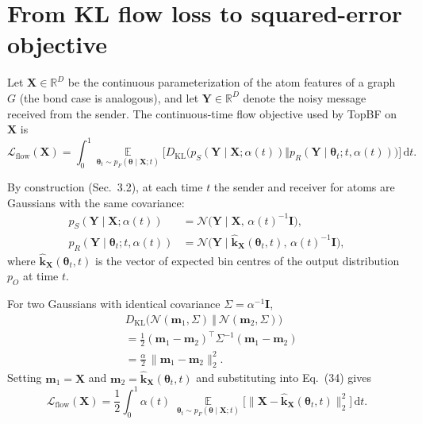 \documentclass[numsec,webpdf,contemporary,large]{oup-authoring-template}%
\theoremstyle{thmstyleone}%
\theoremstyle{thmstyletwo}%
\theoremstyle{thmstylethree}%
\begin{document}
\section{From KL flow loss to squared-error objective}
\label{app:loss}

Let $\mathbf{X}\in\mathbb{R}^{D}$ be the continuous parameterization of the atom features of a graph $G$
(the bond case is analogous), and let $\mathbf{Y}\in\mathbb{R}^{D}$ denote the noisy message received
from the sender. The continuous-time flow objective used by TopBF on $\mathbf{X}$ is
\begin{equation}
\mathcal{L}_{\text{flow}}(\mathbf{X})
=
\int_0^1 
\mathop{\mathbb{E}}\limits_{\boldsymbol{\theta}_t \sim p_F(\boldsymbol{\theta}\mid \mathbf{X};t)} \Big[ D_{\mathrm{KL}}\big( p_S(\mathbf{Y} \mid \mathbf{X};\alpha(t))
\Vert
p_R(\mathbf{Y} \mid \boldsymbol{\theta}_t; t,\alpha(t)) \big) \Big] \,\mathrm{d}t.
\label{eq:cts-flow-kl}
\end{equation}

By construction (Sec.~3.2), at each time $t$ the sender and receiver for atoms are Gaussians with the
same covariance:
\begin{align}
p_S(\mathbf{Y} \mid \mathbf{X};\alpha(t))
&=
\mathcal{N}\big(\mathbf{Y} \mid \mathbf{X},\,\alpha(t)^{-1}\mathbf{I}\big), \\
p_R(\mathbf{Y} \mid \boldsymbol{\theta}_t; t,\alpha(t))
&=
\mathcal{N}\big(\mathbf{Y} \mid \hat{\mathbf{k}}_{\mathbf{X}}(\boldsymbol{\theta}_t,t),\,\alpha(t)^{-1}\mathbf{I}\big),
\end{align}
where $\hat{\mathbf{k}}_{\mathbf{X}}(\boldsymbol{\theta}_t,t)$ is the vector of expected bin centres of
the output distribution $p_O$ at time $t$.

For two Gaussians with identical covariance $\Sigma = \alpha^{-1}\mathbf{I}$,
\begin{equation}
\begin{aligned}
& D_{\mathrm{KL}}\big(
\mathcal{N}(\mathbf{m}_1,\Sigma)\ \Vert\ \mathcal{N}(\mathbf{m}_2,\Sigma)
\big)\\
& =
\frac{1}{2}(\mathbf{m}_1-\mathbf{m}_2)^\top \Sigma^{-1} (\mathbf{m}_1-\mathbf{m}_2) \\
& =
\frac{\alpha}{2}\,\|\mathbf{m}_1-\mathbf{m}_2\|_2^2.
\end{aligned}
\end{equation}
Setting $\mathbf{m}_1=\mathbf{X}$ and $\mathbf{m}_2=\hat{\mathbf{k}}_{\mathbf{X}}(\boldsymbol{\theta}_t,t)$
and substituting into Eq.~(34) gives
\begin{equation}
\mathcal{L}_{\text{flow}}(\mathbf{X})
=
\frac{1}{2}
\int_0^1
\alpha(t)\;
\mathop{\mathbb{E}}\limits_{\boldsymbol{\theta}_t \sim p_F(\boldsymbol{\theta}\mid \mathbf{X};t)}
\big[
\|\mathbf{X}-\hat{\mathbf{k}}_{\mathbf{X}}(\boldsymbol{\theta}_t,t)\|_2^2
\big]\,\mathrm{d}t.
\label{eq:cts-flow-alpha}
\end{equation}
\end{document}
